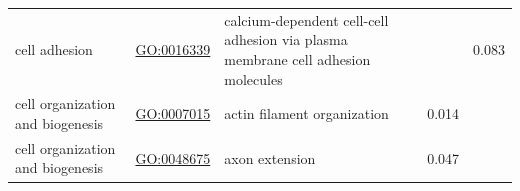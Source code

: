 \documentclass[
]{article}
\begin{document}
\begin{longtable}[]{@{}lllll@{}}
\begin{minipage}[t]{0.17\columnwidth}\raggedright
cell adhesion\strut
\end{minipage} & \begin{minipage}[t]{0.17\columnwidth}\raggedright
\url{GO:0016339}\strut
\end{minipage} & \begin{minipage}[t]{0.17\columnwidth}\raggedright
calcium-dependent cell-cell adhesion via plasma membrane cell adhesion
molecules\strut
\end{minipage} & \begin{minipage}[t]{0.17\columnwidth}\raggedright
\strut
\end{minipage} & \begin{minipage}[t]{0.17\columnwidth}\raggedright
0.083\strut
\end{minipage}\tabularnewline
\begin{minipage}[t]{0.17\columnwidth}\raggedright
cell organization and biogenesis\strut
\end{minipage} & \begin{minipage}[t]{0.17\columnwidth}\raggedright
\url{GO:0007015}\strut
\end{minipage} & \begin{minipage}[t]{0.17\columnwidth}\raggedright
actin filament organization\strut
\end{minipage} & \begin{minipage}[t]{0.17\columnwidth}\raggedright
0.014\strut
\end{minipage} & \begin{minipage}[t]{0.17\columnwidth}\raggedright
\strut
\end{minipage}\tabularnewline
\begin{minipage}[t]{0.17\columnwidth}\raggedright
cell organization and biogenesis\strut
\end{minipage} & \begin{minipage}[t]{0.17\columnwidth}\raggedright
\url{GO:0048675}\strut
\end{minipage} & \begin{minipage}[t]{0.17\columnwidth}\raggedright
axon extension\strut
\end{minipage} & \begin{minipage}[t]{0.17\columnwidth}\raggedright
0.047\strut
\end{minipage} & \begin{minipage}[t]{0.17\columnwidth}\raggedright
\strut
\end{minipage}\tabularnewline

\end{longtable}
\end{document}
